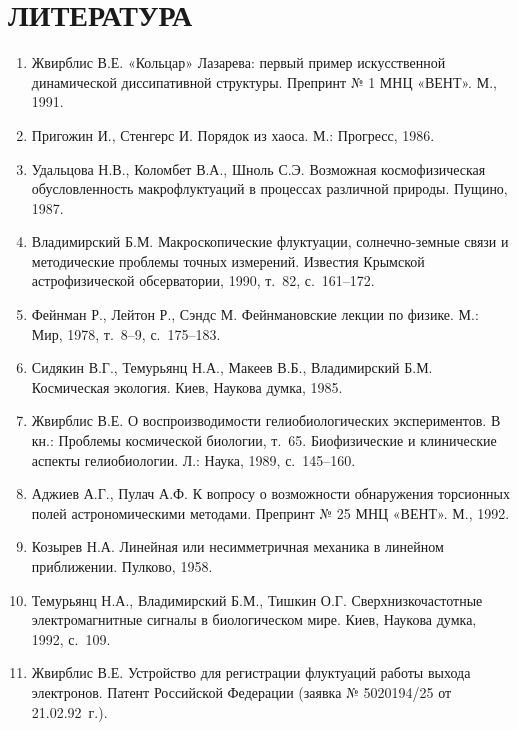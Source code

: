 \documentclass[12pt,a4paper]{article}
\begin{document}
\newpage
\section*{ЛИТЕРАТУРА}

\begin{enumerate}
\item Жвирблис В.Е. «Кольцар» Лазарева: первый пример искусственной динамической
диссипативной структуры. Препринт № 1 МНЦ «ВЕНТ». М., 1991.

\item Пригожин И., Стенгерс И. Порядок из хаоса. М.: Прогресс, 1986.

\item Удальцова Н.В., Коломбет В.А., Шноль С.Э. Возможная космофизическая
обусловленность макрофлуктуаций в процессах различной природы. Пущино, 1987.

\item Владимирский Б.М. Макроскопические флуктуации, солнечно-земные связи и
методические проблемы точных измерений. Известия Крымской астрофизической
обсерватории, 1990, т.~82, с.~161--172.

\item Фейнман Р., Лейтон Р., Сэндс М. Фейнмановские лекции по физике.
М.: Мир, 1978, т.~8--9, с.~175--183.

\item Сидякин В.Г., Темурьянц Н.А., Макеев В.Б., Владимирский Б.М.
Космическая экология. Киев, Наукова думка, 1985.

\item Жвирблис В.Е. О воспроизводимости гелиобиологических экспериментов.
В кн.: Проблемы космической биологии, т.~65. Биофизические и клинические
аспекты гелиобиологии. Л.: Наука, 1989, с.~145--160.

\item Аджиев А.Г., Пулач А.Ф. К вопросу о возможности обнаружения торсионных
полей астрономическими методами. Препринт № 25 МНЦ «ВЕНТ». М., 1992.

\item Козырев Н.А. Линейная или несимметричная механика в линейном приближении.
Пулково, 1958.

\item Темурьянц Н.А., Владимирский Б.М., Тишкин О.Г. Сверхнизкочастотные
электромагнитные сигналы в биологическом мире. Киев, Наукова думка, 1992,
с.~109.

\item Жвирблис В.Е. Устройство для регистрации флуктуаций работы выхода
электронов. Патент Российской Федерации (заявка № 5020194/25 от 21.02.92~г.).
\end{enumerate}
\end{document}
